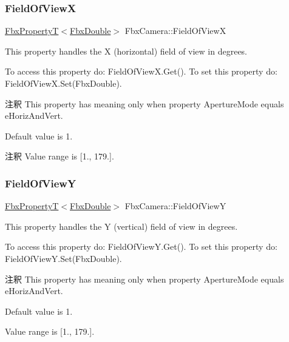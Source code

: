 \subsubsection{\texorpdfstring{Field\+Of\+ViewX}{FieldOfViewX}}
{\footnotesize\ttfamily \hyperlink{class_fbx_property_t}{Fbx\+PropertyT}$<$\hyperlink{fbxtypes_8h_a171e72a1c46fc15c1a6c9c31948c1c5b}{Fbx\+Double}$>$ Fbx\+Camera\+::\+Field\+Of\+ViewX}

This property handles the X (horizontal) field of view in degrees.

To access this property do\+: Field\+Of\+View\+X.\+Get(). To set this property do\+: Field\+Of\+View\+X.\+Set(\+Fbx\+Double).

\begin{DoxyRemark}{注釈}
This property has meaning only when property Aperture\+Mode equals e\+Horiz\+And\+Vert.
\end{DoxyRemark}
Default value is 1. \begin{DoxyRemark}{注釈}
Value range is \mbox{[}1., 179.\mbox{]}. 
\end{DoxyRemark}
\mbox{\label{class_fbx_camera_a924b7ae9b8256f04bd36d726f0131c98}} 
\subsubsection{\texorpdfstring{Field\+Of\+ViewY}{FieldOfViewY}}
{\footnotesize\ttfamily \hyperlink{class_fbx_property_t}{Fbx\+PropertyT}$<$\hyperlink{fbxtypes_8h_a171e72a1c46fc15c1a6c9c31948c1c5b}{Fbx\+Double}$>$ Fbx\+Camera\+::\+Field\+Of\+ViewY}

This property handles the Y (vertical) field of view in degrees.

To access this property do\+: Field\+Of\+View\+Y.\+Get(). To set this property do\+: Field\+Of\+View\+Y.\+Set(\+Fbx\+Double).

\begin{DoxyRemark}{注釈}
This property has meaning only when property Aperture\+Mode equals e\+Horiz\+And\+Vert.

Default value is 1. 

Value range is \mbox{[}1., 179.\mbox{]}. 
\end{DoxyRemark}
\mbox{\label{class_fbx_camera_aeefc9d0c4a6c9c3e17dc265cf2621a47}} 
